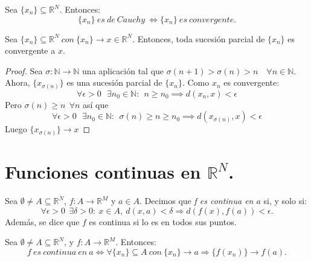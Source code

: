 \begin{nth} 
Sea $\{x_n\}\subseteq \mathbb{R}^N$. Entonces: $$\{x_n\}\ es\ de\ Cauchy\ \iff \{x_n\}\ es\ convergente.$$
\end{nth}



\begin{nprop}
Sea $\{x_n\} \subseteq \mathbb{R}^N\ con\ \{x_n\} \rightarrow x \in \mathbb{R}^N$. Entonces, toda sucesión parcial de $\{x_n\}$ es convergente a $x$.
\end{nprop}
\begin{proof}
	Sea $\sigma :\mathbb N \to \mathbb N$ una aplicación tal que $\sigma(n+1) > \sigma(n) > n \quad \forall n \in \mathbb N$. Ahora, $\{x_{\sigma(n)}\}$ es una sucesión parcial de $\{x_n\}$. Como $x_n$ es convergente:
	\[
	\forall \epsilon > 0 \ \ \ \exists n_0 \in \mathbb N : \ \ n \geq n_0 \implies d(x_n,x) < \epsilon
	\]
	Pero $\sigma(n) \geq n \ \ \forall n$ así que
	\[
	\forall \epsilon > 0 \ \ \ \exists n_0 \in \mathbb N : \ \ \sigma(n) \geq n \geq n_0 \implies d(x_{\sigma(n)},x) < \epsilon
	\]
	Luego $\{x_{\sigma(n)}\}\to x$
\end{proof}

\newpage


\section{Funciones continuas en $\mathbb{R}^N$.}



\begin{ndef}
Sea $\emptyset \ne A\subseteq \mathbb{R}^N$, $f: A \longrightarrow \mathbb{R}^M$ y $a \in A$. Decimos que \textit{f es continua en $a$} si, y solo si: $$\forall \epsilon > 0\ \ \exists \delta > 0: \ x\in A, \ d(x,a)<\delta \Rightarrow d(f(x),f(a))<\epsilon.$$
Además, se dice que $f$ es continua si lo es en todos sus puntos.
\end{ndef}



\begin{nprop}
Sea $\emptyset \ne A \subseteq \mathbb{R}^N$, y $f:A\longrightarrow \mathbb{R}^M$. Entonces: $$f\ es\ continua\ en\ a \iff \forall \{x_n\}\subseteq A\ con\ \{x_n\} \rightarrow a \Rightarrow \{f(x_n)\} \rightarrow f(a).$$
\end{nprop}



